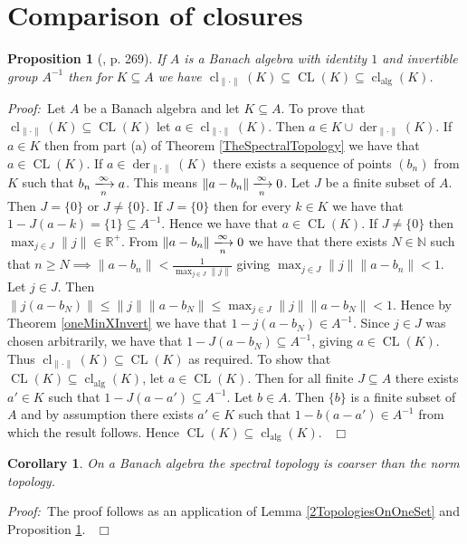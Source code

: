\documentclass[12pt, oneside]{book}
\newtheorem{corollary}[theorem]{Corollary}
\newtheorem{proposition}[theorem]{Proposition}
\newcommand{\proof}{{\noindent \it Proof:~}}
\newcommand{\qed}{\hfill ~$\Box$\\}
\def\cl{\operatorname{cl}}
\def\CL{\operatorname{CL}}
\def\alg{\operatorname{alg}}
\def\der{\operatorname{der}}
\def\max{\operatorname{max}}
\begin{document}
\section{Comparison of closures}

\begin{proposition}[\cite{CH3}, p. 269] \label{ContainmentOfClosures}
\normalfont
\noindent If $A$ is a Banach algebra with identity $1$ 
and invertible group $A^{-1}$ then for $K \subseteq A$ we have 
$\cl_{\| \cdot \|}(K)  \subseteq  \CL(K)  \subseteq  \cl_{\alg}(K)$.
\end{proposition}

\proof \space Let $A$ be a Banach algebra and let $K \subseteq A$. To prove that $\cl_{\| \cdot \|}(K) \subseteq \CL(K)$ let $a \in \cl_{\| \cdot \|}(K)$. 
Then $a \in K \cup \der_{\|\cdot\|}(K)$. If $a \in K$ then from part (a) of Theorem
 \ref{TheSpectralTopology} we 
have that $a \in \CL(K)$. If $a \in \der_{\|\cdot\|}(K)$ there exists a sequence of points $(b_n)$ 
from $K$ such that $b_n \xlongrightarrow[n]{\infty} a$. 
This means $\| a - b_n \| \xlongrightarrow[n]{\infty} 0$. Let $J$ be a finite subset of $A$. 
Then $J = \{0 \}$ or $J \not = \{0 \}$. If $J = \{0 \}$ then for every $k \in K$ we have that 
$1 - J(a - k) = \{1\} \subseteq A^{-1}$. Hence we have that $a \in \CL(K)$. If $J \not = \{0\}$ then 
$\displaystyle{\max_{j \in J} \| j \| \in \mathbb{R}^+}$. From  
$\| a-b_n \| \xlongrightarrow[n]{\infty} 0$ we have that there exists $N \in \mathbb{N}$ 
such that $n \geqslant N \implies \| a - b_n \| < \frac{1}{\max_{j \in J} \| j \| }$ giving 
$\displaystyle{\max_{j \in J} \| j \| \| a-b_n \| < 1}$. Let $j \in J$. 
Then $\| j(a-b_N) \| \leq \| j \|  \| a-b_N \| \leq \max_{j \in J} \| j \| \| a-b_N \| < 1$. 
Hence by Theorem \ref{oneMinXInvert} we have that $1-j(a-b_N) \in A^{-1}$. Since $j \in J$ was chosen 
arbitrarily, we have that $1 - J(a-b_N) \subseteq A^{-1}$, giving $a \in \CL(K)$. 
Thus $\cl_{\| \cdot \|}(K) \subseteq \CL(K)$ as required.
\vskip 0.3cm
\noindent To show that $\CL(K)  \subseteq  \cl_{\alg}(K)$, let $a \in \CL(K)$. 
Then for all finite  $J \subseteq A$ there exists $a' \in K$ such that 
$1-J(a-a') \subseteq A^{-1}$. Let $b \in A$. Then $\{ b \}$ is a finite subset of $A$ and by 
assumption there exists $a' \in K$ such that $1-b(a-a') \in A^{-1}$ from which the result follows. 
Hence $\CL(K) \subseteq \cl_{\alg}(K)$. \qed

\begin{corollary}
\normalfont
On a Banach algebra the spectral topology is coarser than the norm topology.
\end{corollary}
\proof \space  The proof follows as an application of Lemma \ref{2TopologiesOnOneSet} 
and Proposition \ref{ContainmentOfClosures}. \qed
\end{document}
